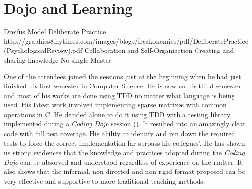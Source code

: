 \section{Dojo and Learning}\label{sec:learning}

Dreifus Model
Deliberate Practice
	http://graphics8.nytimes.com/images/blogs/freakonomics/pdf/DeliberatePractice(PsychologicalReview).pdf
Collaboration and Self-Organization
Creating and sharing knowledge
No single Master

One of the attendees joined the sessions just at the beginning when he
had just finished his first semester in Computer Science. He is now on
his third semester and most of his works are done using TDD no matter
what language is being used. His latest work involved implementing
sparse matrixes with common operations in C. He decided alone to do it
using TDD with a testing library implemented during a \textit{Coding
  Dojo} session (\cite{Dojo31}). It resulted into an amazingly clear
code with full test coverage. His ability to identify and pin down the
required tests to force the correct implementation far surpass his
collegues'. He has shown us strong evidences that the knowledge and
practices adopted during the \textit{Coding Dojo} can be absorved and
understood regardless of experience on the matter. It also shows that
the informal, non-directed and non-rigid format proposed can be very
effective and supportive to more traditional teaching methods.

